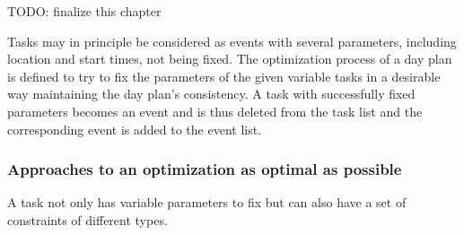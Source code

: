 TODO: finalize this chapter\newline

Tasks may in principle be considered as events with several parameters, including location and start times, not being fixed. The optimization process of a day plan is defined to try to fix the parameters of the given variable tasks in a desirable way maintaining the day plan's consistency. A task with successfully fixed parameters becomes an event and is thus deleted from the task list and the corresponding event is added to the event list.

 \subsubsection{Approaches to an optimization as optimal as possible}
 
  A task not only has variable parameters to fix but can also have a set of constraints of different types. 